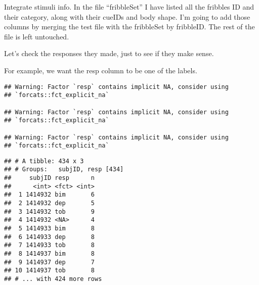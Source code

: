 \documentclass[
]{article}
\newenvironment{Shaded}{\begin{snugshade}}{\end{snugshade}}
\newcommand{\DataTypeTok}[1]{\textcolor[rgb]{0.13,0.29,0.53}{#1}}
\newcommand{\KeywordTok}[1]{\textcolor[rgb]{0.13,0.29,0.53}{\textbf{#1}}}
\newcommand{\NormalTok}[1]{#1}
\newcommand{\OperatorTok}[1]{\textcolor[rgb]{0.81,0.36,0.00}{\textbf{#1}}}
\newcommand{\OtherTok}[1]{\textcolor[rgb]{0.56,0.35,0.01}{#1}}
\newcommand{\StringTok}[1]{\textcolor[rgb]{0.31,0.60,0.02}{#1}}
\begin{document}
Integrate stimuli info. In the file ``fribbleSet'' I have listed all the
fribbles ID and their category, along with their cueIDs and body shape.
I'm going to add those columns by merging the test file with the
fribbleSet by fribbleID. The rest of the file is left untouched.

\begin{Shaded}
\end{Shaded}

Let's check the responses they made, just to see if they make sense.

For example, we want the resp column to be one of the labels.

\begin{Shaded}
\end{Shaded}

\begin{verbatim}
## Warning: Factor `resp` contains implicit NA, consider using
## `forcats::fct_explicit_na`

## Warning: Factor `resp` contains implicit NA, consider using
## `forcats::fct_explicit_na`

## Warning: Factor `resp` contains implicit NA, consider using
## `forcats::fct_explicit_na`
\end{verbatim}

\begin{verbatim}
## # A tibble: 434 x 3
## # Groups:   subjID, resp [434]
##     subjID resp      n
##      <int> <fct> <int>
##  1 1414932 bim       6
##  2 1414932 dep       5
##  3 1414932 tob       9
##  4 1414932 <NA>      4
##  5 1414933 bim       8
##  6 1414933 dep       8
##  7 1414933 tob       8
##  8 1414937 bim       8
##  9 1414937 dep       7
## 10 1414937 tob       8
## # ... with 424 more rows
\end{verbatim}
\end{document}
